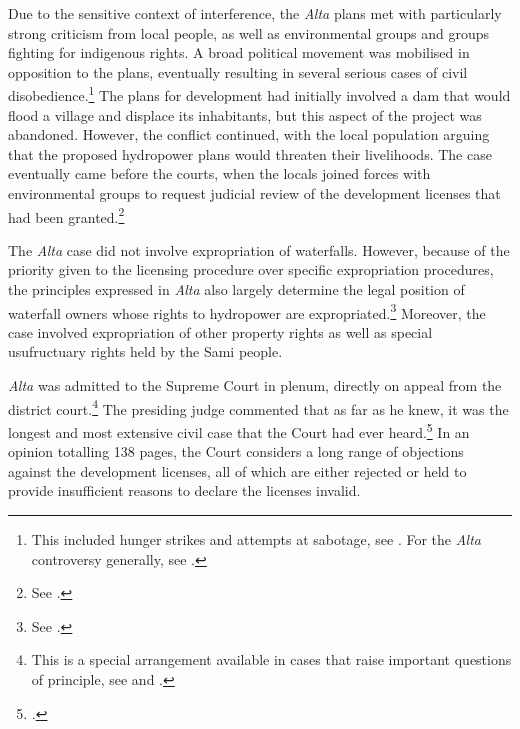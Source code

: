 Due to the sensitive context of interference, the {\it Alta} plans met with particularly strong criticism from local people, as well as environmental groups and groups fighting for indigenous rights. A broad political movement was mobilised in opposition to the plans, eventually resulting in several serious cases of civil disobedience.\footnote{This included hunger strikes and attempts at sabotage, see \cite[80-83]{nilsen08}. For the {\it Alta} controversy generally, see \cite{hjorthol06,altawiki}.} 
The plans for development had initially involved a dam that would flood a village and displace its inhabitants, but this aspect of the project was abandoned. However, the conflict continued, with the local population arguing that the proposed hydropower plans would threaten their livelihoods. The case eventually came before the courts, when the locals joined forces with environmental groups to request judicial review of the development licenses that had been granted.\footnote{See \cite{eckhoff82}.}

The {\it Alta} case did not involve expropriation of waterfalls. However, because of the priority given to the licensing procedure over specific expropriation procedures, the principles expressed in {\it Alta} also largely determine the legal position of waterfall owners whose rights to hydropower are expropriated.\footnote{See \cite{sauda09,jorpeland11}.} Moreover, the case involved expropriation of other property rights as well as special usufructuary rights held by the Sami people.

{\it Alta} was admitted to the Supreme Court in plenum, directly on appeal from the district court.\footnote{This is a special arrangement available in cases that raise important questions of principle, see \dni\cite[30-2]{cda05} and \dni\cite[5]{ca15}.} The presiding judge commented that as far as he knew, it was the longest and most extensive civil case that the Court had ever heard.\footcite[254]{alta82} In an opinion totalling 138 pages, the Court considers a long range of objections against the development licenses, all of which are either rejected or held to provide insufficient reasons to declare the licenses invalid.

